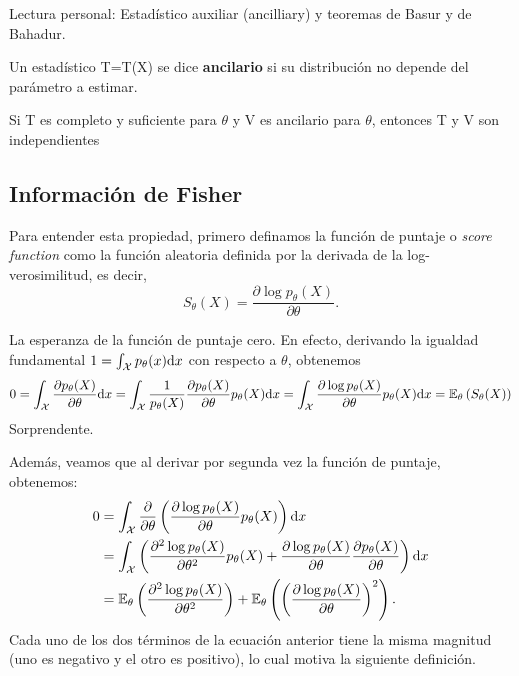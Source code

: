 \begin{remark}
Lectura personal: Estadístico auxiliar (ancilliary) y teoremas de Basur y de Bahadur. 
\end{remark}

\begin{definition}
Un estadístico T=T(X) se dice \textbf{ancilario} si su distribución no depende del parámetro a estimar.
\end{definition}

\begin{theorem}
Si T es completo y suficiente para $\theta$ y V es ancilario para $\theta$, entonces T y V son independientes
\end{theorem}


\subsection{Información de Fisher}

Para entender esta propiedad, primero definamos la función de puntaje o \textit{score function} como la {función aleatoria} definida por la derivada de la log-verosimilitud, es decir, 
\begin{equation}
	S_\theta(X) = \frac{\partial \log p_\theta(X)}{\partial\theta}.
\end{equation}

\begin{remark}
La esperanza de la función de puntaje cero. En efecto, derivando la igualdad fundamental $1 = \int_{\mathcal X} p_\theta(x){\text{d}x}$ con respecto a $\theta$, obtenemos 
\begin{align}
	0 = \int_{\mathcal X} \frac{\partial  p_\theta(X)}{\partial\theta} {\text{d}x} = \int_{\mathcal X} \frac{1}{p_\theta(X)}\frac{\partial  p_\theta(X)}{\partial\theta} p_\theta(X) {\text{d}x} = \int_{\mathcal X} \frac{\partial \log   p_\theta(X)}{\partial\theta} p_\theta(X) {\text{d}x} = \mathbb{E}_\theta \left(S_\theta(X)\right)
\end{align}
Sorprendente. 
\end{remark}

Además, veamos que al derivar por segunda vez la función de puntaje, obtenemos: 
\begin{align*}
	0 &= \int_{\mathcal X} \frac{\partial}{\partial \theta }\left(\frac{\partial \log   p_\theta(X)}{\partial\theta} p_\theta(X) \right){\text{d}x}\\ 
	&= \int_{\mathcal X} \left(\frac{\partial^2 \log   p_\theta(X)}{\partial\theta^2} p_\theta(X) + \frac{\partial \log   p_\theta(X)}{\partial\theta}\frac{\partial   p_\theta(X)}{\partial\theta}  \right){\text{d}x}\\
	&= \mathbb{E}_\theta \left(\frac{\partial^2 \log   p_\theta(X)}{\partial\theta^2}\right) + \mathbb{E}_\theta \left(\left(\frac{\partial \log   p_\theta(X)}{\partial\theta}\right)^2\right).
\end{align*}
Cada uno de los dos términos de la ecuación anterior tiene la misma magnitud (uno es negativo y el otro es positivo), lo cual motiva la siguiente definición.

